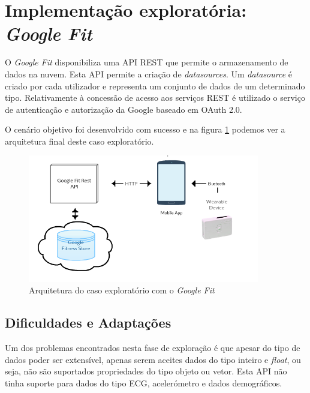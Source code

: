 \section{Implementação exploratória: \textit{Google Fit}}

O \textit{Google Fit} disponibiliza uma \gls{API} \gls{REST} que permite o armazenamento de dados na nuvem. Esta \gls{API} permite a criação  de \textit{datasources}. Um \textit{datasource} é criado por cada utilizador e representa  um conjunto de dados de um determinado tipo. Relativamente à concessão de acesso aos serviços \gls{REST} é utilizado o serviço de autenticação e autorização da Google baseado em OAuth 2.0. 
\par
O cenário objetivo foi desenvolvido com sucesso e na figura \ref{f:exp-googlefit-arch} podemos ver a arquitetura final deste caso exploratório.
\begin{figure}[H]
  \centering
  \includegraphics[width=0.9\textwidth]{imgs/googlefit-arch-exp.png}
  \caption[Arquitetura do caso exploratório com o \textit{Google Fit}]{Arquitetura do caso exploratório com o \textit{Google Fit}}
  
  \label{f:exp-googlefit-arch}
\end{figure}

\subsection{Dificuldades e Adaptações}

Um dos problemas encontrados nesta fase de exploração é que apesar do tipo de dados poder ser extensível, apenas serem aceites dados do tipo inteiro e \textit{float}, ou seja, não são suportados propriedades do tipo objeto ou vetor. Esta \gls{API} não tinha suporte para dados do tipo \gls{ECG}, acelerómetro e dados demográficos.

